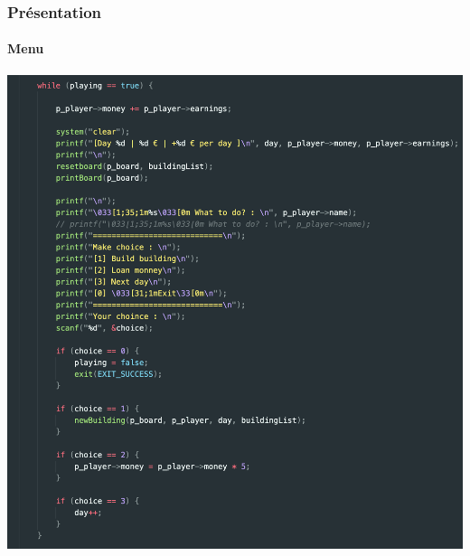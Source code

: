 \documentclass{beamer}
\begin{document}
\begin{frame} %
    \frametitle{Présentation}
    \framesubtitle{Menu}
    
    \begin{center}
        \includegraphics[scale=0.24]{src/images/menu.png}
    \end{center}
    
    \end{frame}
\end{document}
